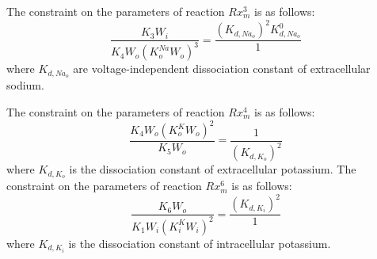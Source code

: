 The constraint on the parameters of reaction $Rx_m^3$ is as follows:
\begin{equation}
      \label{eq:constraint2}
\dfrac{K_3W_i}{K_4W_o(K_o^{Na}W_o)^3} = \dfrac{(K_{d,Na_o})^2K_{d,Na_o}^0}{1}
\end{equation}
where $K_{d,Na_o}$ are voltage-independent dissociation constant of extracellular sodium.

The constraint on the parameters of reaction $Rx_m^4$ is as follows:
\begin{equation}
      \label{eq:constraint3}
\dfrac{K_4W_o(K_o^{K}W_o)^2}{K_5W_o} = \dfrac{1}{(K_{d,K_o})^2}
\end{equation}
where $K_{d,K_o}$ is the dissociation constant of extracellular potassium.
The constraint on the parameters of reaction $Rx_m^6$ is as follows:
\begin{equation}
      \label{eq:constraint4}
\dfrac{K_6W_o}{K_1W_i(K_i^{K}W_i)^2} = \dfrac{(K_{d,K_i})^2}{1}
\end{equation}
where $K_{d,K_i}$ is the dissociation constant of intracellular potassium.

